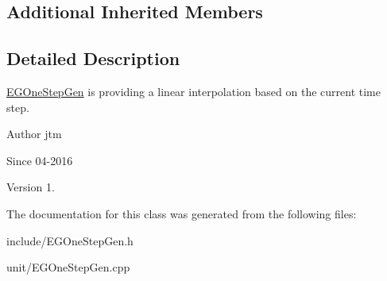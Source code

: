 \subsection*{Additional Inherited Members}


\subsection{Detailed Description}
\hyperlink{classunit_1_1EGOneStepGen}{E\+G\+One\+Step\+Gen} is providing a linear interpolation based on the current time step.

\begin{DoxyAuthor}{Author}
jtm 
\end{DoxyAuthor}
\begin{DoxySince}{Since}
04-\/2016 
\end{DoxySince}
\begin{DoxyVersion}{Version}
1. 
\end{DoxyVersion}


The documentation for this class was generated from the following files\+:\begin{DoxyCompactItemize}
\item 
include/E\+G\+One\+Step\+Gen.\+h\item 
unit/E\+G\+One\+Step\+Gen.\+cpp\end{DoxyCompactItemize}
